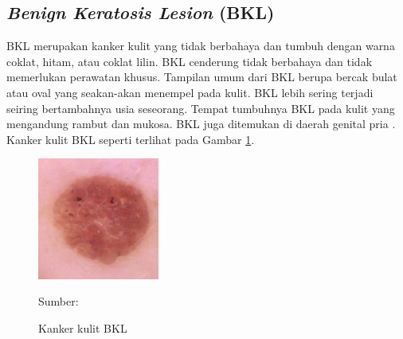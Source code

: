     \subsection{\textit{Benign Keratosis Lesion} (BKL)}
    BKL merupakan kanker kulit yang tidak berbahaya dan tumbuh dengan warna coklat, hitam, atau coklat lilin. BKL cenderung tidak berbahaya dan tidak memerlukan perawatan khusus. Tampilan umum dari BKL berupa bercak bulat atau oval yang seakan-akan menempel pada kulit. BKL lebih sering terjadi seiring bertambahnya usia seseorang. Tempat tumbuhnya BKL pada kulit yang mengandung rambut dan mukosa. BKL juga ditemukan di daerah genital pria \citep{Hall2019}. Kanker kulit BKL seperti terlihat pada Gambar \ref{fig:bkl}.
    \begin{figure}[H] 
        \begin{center} 
            \includegraphics[width=4cm]{../img/Skin Cancer BKL - Latex.jpg}
            \caption{Kanker kulit BKL} 
            \label{fig:bkl}
            Sumber: \citep{Codella2018,Combalia2019,Tschandl2018}
        \end{center} 
    \end{figure}

